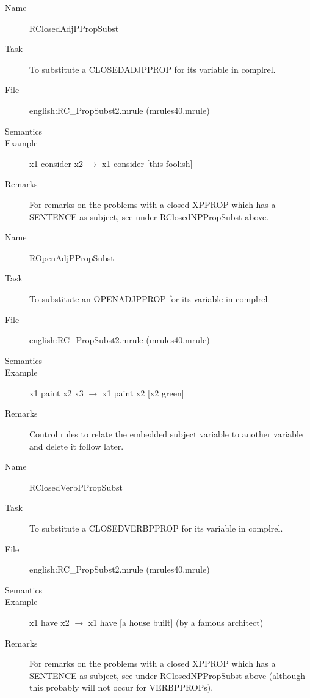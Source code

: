 \begin{description}
\vspace{1 cm}
\begin{description}
\item[Name]   RClosedAdjPPropSubst
\item[Task] To substitute a CLOSEDADJPPROP for its variable in 
complrel. 
\item[File] english:RC\_PropSubst2.mrule (mrules40.mrule)
\item[Semantics]
\item[Example] x1 consider x2 $\rightarrow$ x1 consider [this foolish]
\item[Remarks] For remarks on the problems with a closed XPPROP which has a 
SENTENCE as subject, see under RClosedNPPropSubst above.
\end{description}

\vspace{1 cm}
\begin{description}
\item[Name] ROpenAdjPPropSubst
\item[Task] To substitute an OPENADJPPROP for its variable in 
complrel. 
\item[File] english:RC\_PropSubst2.mrule (mrules40.mrule)
\item[Semantics]
\item[Example] x1 paint x2 x3 $\rightarrow$ x1 paint x2 [x2 green]
\item[Remarks] Control rules to relate the embedded subject variable to 
another variable and delete it follow later.
\end{description}

\vspace{1 cm}
\begin{description}
\item[Name]   RClosedVerbPPropSubst
\item[Task] To substitute a CLOSEDVERBPPROP for its variable in 
complrel. 
\item[File] english:RC\_PropSubst2.mrule (mrules40.mrule)
\item[Semantics]
\item[Example] x1 have x2 $\rightarrow$ x1 have [a house built] (by a famous 
architect)
\item[Remarks] For remarks on the problems with a closed XPPROP which has a 
SENTENCE as subject, see under RClosedNPPropSubst above (although this probably 
will not occur for VERBPPROPs).
\end{description}


\end{description}
